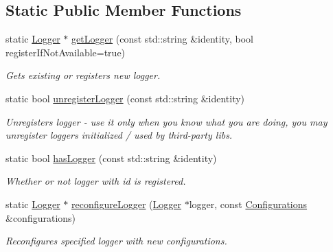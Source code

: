 \subsection*{Static Public Member Functions}
\begin{DoxyCompactItemize}
\item 
\mbox{\label{classel_1_1_loggers_aaebf868c558e3ba1d2e4f073a00f1d4a}} 
static \hyperlink{classel_1_1_logger}{Logger} $\ast$ \hyperlink{classel_1_1_loggers_aaebf868c558e3ba1d2e4f073a00f1d4a}{get\+Logger} (const std\+::string \&identity, bool register\+If\+Not\+Available=true)
\begin{DoxyCompactList}\small\item\em Gets existing or registers new logger. \end{DoxyCompactList}\item 
\mbox{\label{classel_1_1_loggers_a201d261ea57c070f07f0bf2006158587}} 
static bool \hyperlink{classel_1_1_loggers_a201d261ea57c070f07f0bf2006158587}{unregister\+Logger} (const std\+::string \&identity)
\begin{DoxyCompactList}\small\item\em Unregisters logger -\/ use it only when you know what you are doing, you may unregister loggers initialized / used by third-\/party libs. \end{DoxyCompactList}\item 
\mbox{\label{classel_1_1_loggers_a2d7a056cb7d9da3d96c709a2fac5c2bb}} 
static bool \hyperlink{classel_1_1_loggers_a2d7a056cb7d9da3d96c709a2fac5c2bb}{has\+Logger} (const std\+::string \&identity)
\begin{DoxyCompactList}\small\item\em Whether or not logger with id is registered. \end{DoxyCompactList}\item 
\mbox{\label{classel_1_1_loggers_a888aca5bdccccc322da2eed430909d04}} 
static \hyperlink{classel_1_1_logger}{Logger} $\ast$ \hyperlink{classel_1_1_loggers_a888aca5bdccccc322da2eed430909d04}{reconfigure\+Logger} (\hyperlink{classel_1_1_logger}{Logger} $\ast$logger, const \hyperlink{classel_1_1_configurations}{Configurations} \&configurations)
\begin{DoxyCompactList}\small\item\em Reconfigures specified logger with new configurations. \end{DoxyCompactList}\item 

\end{DoxyCompactItemize}
